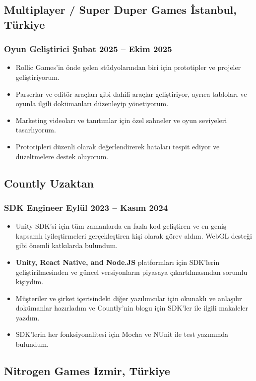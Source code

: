\documentclass[11pt]{article}
\newcommand{\rside}[1]{
  \hfill {\normalfont\color{accent} #1}%
}
\begin{document}
\subsection{Multiplayer / Super Duper Games \rside{İstanbul, Türkiye}}
\subsubsection{Oyun Geliştirici \rside{Şubat 2025 -- Ekim 2025}}
\begin{itemize}
  \item Rollic Games'in önde gelen stüdyolarından biri için prototipler ve projeler geliştiriyorum.
  \item Parserlar ve editör araçları gibi dahili araçlar geliştiriyor, ayrıca tabloları ve oyunla ilgili dokümanları düzenleyip yönetiyorum.
  \item Marketing videoları ve tanıtımlar için özel sahneler ve oyun seviyeleri tasarlıyorum.
  \item Prototipleri düzenli olarak değerlendirerek hataları tespit ediyor ve düzeltmelere destek oluyorum.
\end{itemize}

\subsection{Countly \rside{Uzaktan}}
\subsubsection{SDK Engineer \rside{Eylül 2023 -- Kasım 2024}}
\begin{itemize}
  \item Unity SDK'si için tüm zamanlarda en fazla kod geliştiren ve en geniş kapsamlı iyileştirmeleri gerçekleştiren kişi olarak görev aldım. WebGL desteği gibi önemli katkılarda bulundum.
  \item \textbf{Unity, React Native, and Node.JS} platformları için SDK'lerin geliştirilmesinden ve güncel versiyonların piyasaya çıkartılmasından sorumlu kişiydim.
  \item Müşteriler ve şirket içerisindeki diğer yazılımcılar için okunaklı ve anlaşılır dokümanlar hazırladım ve Countly'nin blogu için SDK'ler ile ilgili makaleler yazdım.
  \item SDK'lerin her fonksiyonalitesi için Mocha ve NUnit ile test yazımında bulundum.
\end{itemize}

\subsection{Nitrogen Games \rside{Izmir, Türkiye}}
\end{document}
